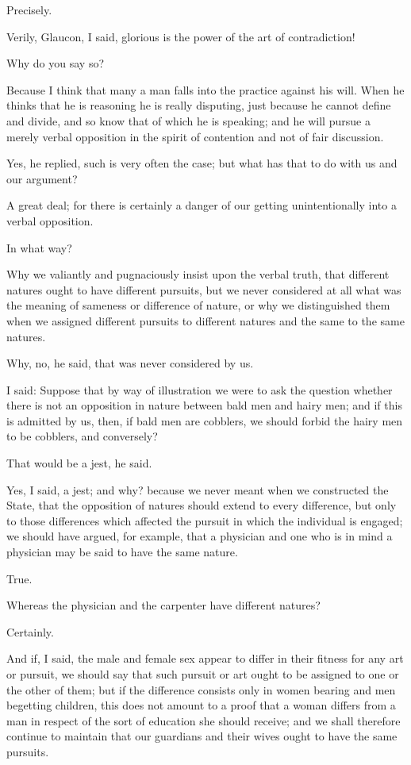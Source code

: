 Precisely.

Verily, Glaucon, I said, glorious is the power of the art of
contradiction!

Why do you say so?

Because I think that many a man falls into the practice against his
will. When he thinks that he is reasoning he is really disputing, just
because he cannot define and divide, and so know that of which he is
speaking; and he will pursue a merely verbal opposition in the spirit of
contention and not of fair discussion.

Yes, he replied, such is very often the case; but what has that to do
with us and our argument?

A great deal; for there is certainly a danger of our getting
unintentionally into a verbal opposition.

In what way?

Why we valiantly and pugnaciously insist upon the verbal truth, that
different natures ought to have different pursuits, but we never
considered at all what was the meaning of sameness or difference of
nature, or why we distinguished them when we assigned different pursuits
to different natures and the same to the same natures.

Why, no, he said, that was never considered by us.

I said: Suppose that by way of illustration we were to ask the question
whether there is not an opposition in nature between bald men and hairy
men; and if this is admitted by us, then, if bald men are cobblers, we
should forbid the hairy men to be cobblers, and conversely?

That would be a jest, he said.

Yes, I said, a jest; and why? because we never meant when we constructed
the State, that the opposition of natures should extend to every
difference, but only to those differences which affected the pursuit
in which the individual is engaged; we should have argued, for example,
that a physician and one who is in mind a physician may be said to have
the same nature.

True.

Whereas the physician and the carpenter have different natures?

Certainly.

And if, I said, the male and female sex appear to differ in their
fitness for any art or pursuit, we should say that such pursuit or art
ought to be assigned to one or the other of them; but if the difference
consists only in women bearing and men begetting children, this does not
amount to a proof that a woman differs from a man in respect of the
sort of education she should receive; and we shall therefore continue
to maintain that our guardians and their wives ought to have the same
pursuits.

